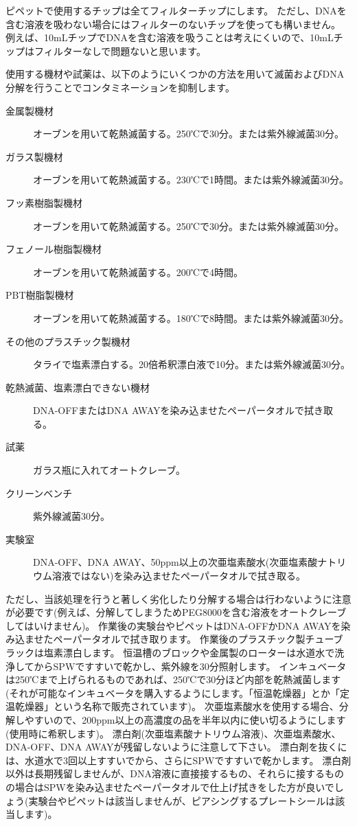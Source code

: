 \documentclass[titlepage,10pt,a4paper,uplatex]{jsbook}
\begin{document}
ピペットで使用するチップは全てフィルターチップにします。
ただし、DNAを含む溶液を吸わない場合にはフィルターのないチップを使っても構いません。
例えば、10mLチップでDNAを含む溶液を吸うことは考えにくいので、10mLチップはフィルターなしで問題ないと思います。

使用する機材や試薬は、以下のようにいくつかの方法を用いて滅菌およびDNA分解を行うことでコンタミネーションを抑制します。

\begin{description}
\item[金属製機材] オーブンを用いて乾熱滅菌する。250℃で30分。または紫外線滅菌30分。
\item[ガラス製機材] オーブンを用いて乾熱滅菌する。230℃で1時間。または紫外線滅菌30分。
\item[フッ素樹脂製機材] オーブンを用いて乾熱滅菌する。250℃で30分。または紫外線滅菌30分。
\item[フェノール樹脂製機材] オーブンを用いて乾熱滅菌する。200℃で4時間。
\item[PBT樹脂製機材] オーブンを用いて乾熱滅菌する。180℃で8時間。または紫外線滅菌30分。
\item[その他のプラスチック製機材] タライで塩素漂白する。20倍希釈漂白液で10分。または紫外線滅菌30分。
\item[乾熱滅菌、塩素漂白できない機材] DNA-OFFまたはDNA AWAYを染み込ませたペーパータオルで拭き取る。
\item[試薬] ガラス瓶に入れてオートクレーブ。
\item[クリーンベンチ] 紫外線滅菌30分。
\item[実験室] DNA-OFF、DNA AWAY、50ppm以上の次亜塩素酸水(次亜塩素酸ナトリウム溶液ではない)を染み込ませたペーパータオルで拭き取る。
\end{description}

ただし、当該処理を行うと著しく劣化したり分解する場合は行わないように注意が必要です(例えば、分解してしまうためPEG8000を含む溶液をオートクレーブしてはいけません)。
作業後の実験台やピペットはDNA-OFFかDNA AWAYを染み込ませたペーパータオルで拭き取ります。
作業後のプラスチック製チューブラックは塩素漂白します。
恒温槽のブロックや金属製のローターは水道水で洗浄してからSPWですすいで乾かし、紫外線を30分照射します。
インキュベータは250℃まで上げられるものであれば、250℃で30分ほど内部を乾熱滅菌します(それが可能なインキュベータを購入するようにします。「恒温乾燥器」とか「定温乾燥器」という名称で販売されています)。
次亜塩素酸水を使用する場合、分解しやすいので、200ppm以上の高濃度の品を半年以内に使い切るようにします(使用時に希釈します)。
漂白剤(次亜塩素酸ナトリウム溶液)、次亜塩素酸水、DNA-OFF、DNA AWAYが残留しないように注意して下さい。
漂白剤を抜くには、水道水で3回以上すすいでから、さらにSPWですすいで乾かします。
漂白剤以外は長期残留しませんが、DNA溶液に直接接するもの、それらに接するものの場合はSPWを染み込ませたペーパータオルで仕上げ拭きをした方が良いでしょう(実験台やピペットは該当しませんが、ピアシングするプレートシールは該当します)。
\end{document}
